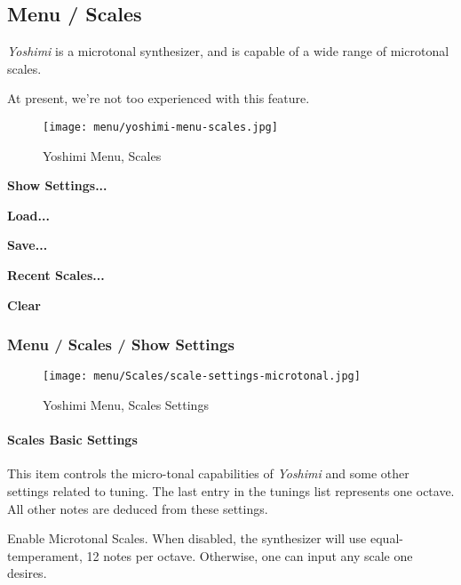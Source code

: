 \subsection{Menu / Scales}
\label{subsec:menu_scales}

   \textsl{Yoshimi} is a microtonal synthesizer, and is capable of a wide
   range of microtonal scales.

   At present, we're not too experienced with this feature.

\begin{figure}[H]
   \centering 
   \texttt{[image: menu/yoshimi-menu-scales.jpg]}
   \caption{Yoshimi Menu, Scales}
   \label{fig:yoshimi_menu_scales}
\end{figure}

   \begin{enumber}
      \item \textbf{Show Settings...}
      \item \textbf{Load...}
      \item \textbf{Save...}
      \item \textbf{Recent Scales...}
      \item \textbf{Clear}
   \end{enumber}

\subsubsection{Menu / Scales / Show Settings}
\label{subsec:menu_scales_show}

\begin{figure}[H]
   \centering 
   \texttt{[image: menu/Scales/scale-settings-microtonal.jpg]}
   \caption{Yoshimi Menu, Scales Settings}
   \label{fig:yoshimi_menu_scales_settings}
\end{figure}

\paragraph{Scales Basic Settings}
\label{paragraph:menu_scales_basic_settings}

   This item controls the micro-tonal capabilities of \textsl{Yoshimi} and
   some other settings related to tuning. 
   The last entry in the tunings list represents one octave.
   All other notes are deduced from these settings.

   \setcounter{ItemCounter}{0}      %

   Enable Microtonal Scales.
   When disabled, the synthesizer will use equal-temperament, 12 notes per
   octave.  Otherwise, one can input any scale one desires.

